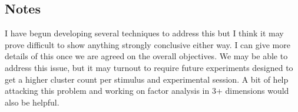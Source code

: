 \documentclass{article}
\begin{document}


\subsection{Notes}
I have begun developing several techniques to address this but I think it may prove difficult to show anything strongly conclusive either way. I can give more details of this once we are agreed on the overall objectives. We may be able to address this issue, but it may turnout to require future experiments designed to get a higher cluster count per stimulus and experimental session. A bit of help attacking this problem and working on factor analysis in 3+ dimensions would also be helpful.








\end{document}
